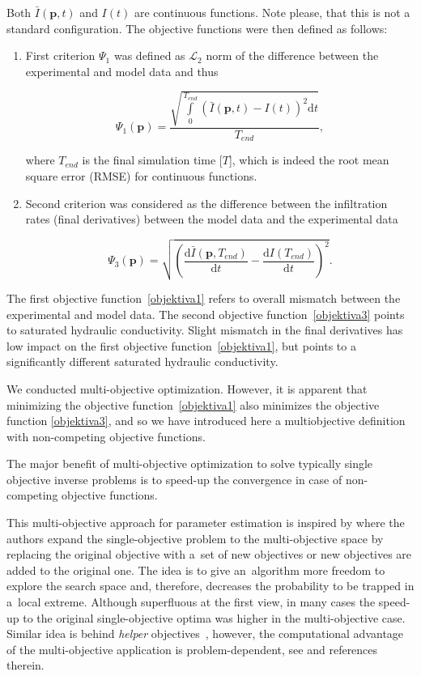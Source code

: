 \documentclass[review,times,3p,10pt]{elsarticle}
\newenvironment{lineq}
    {\begin{linenomath*}
    \begin{equation}
    }
    { 
    \end{equation} 
    \end{linenomath*}
    }
\newcommand{\dd}{\mathrm{d}}
\renewcommand{\vec}{\mathbf}
\begin{document}
{ Both $\bar{I}(\vec{p},t)$ and $I(t)$ are continuous functions. Note please, that this is not a standard configuration. The objective functions were then defined as follows:
\begin{enumerate}[label={\bf \Roman*}.]
\item First criterion $\Psi_1$ was defined as $\mathcal{L}_2$ norm of the difference between the  experimental and model data and thus
\begin{lineq}
\label{objektiva1}
\Psi_1 (\vec{p}) = \frac{\sqrt{\int\limits_0^{T_{end}} \left( \bar{I}(\vec{p},t) - I(t) \right)^2 \dd t}}{T_{end}},
\end{lineq}
where $T_{end}$ is the final simulation time [$T$], which is indeed the root mean square error (RMSE) for continuous functions. 

\item Second criterion was considered as the difference between the infiltration rates (final derivatives) between the model data and the experimental data
\begin{lineq}
\label{objektiva3}
\Psi_3 (\vec{p}) =  \sqrt{\left( \frac{\dd \bar{I}(\vec{p},T_{end})}{\dd t} - \frac{\dd I(T_{end})}{\dd t} \right)^2}.
\end{lineq}


\end{enumerate}

{ The first objective function~\eqref{objektiva1} refers to overall mismatch between the experimental and model data. 
The second objective function~\eqref{objektiva3} points to saturated hydraulic conductivity. Slight mismatch in the final derivatives has low impact on the first objective function~\eqref{objektiva1}, but points to a significantly different saturated hydraulic conductivity. }

 We conducted multi-objective optimization. However, it is apparent that minimizing the objective function~\eqref{objektiva1} also minimizes the objective function \eqref{objektiva3}, and so we have introduced here a multiobjective definition with  non-competing objective functions. 

The major benefit of multi-objective optimization  to solve typically single objective inverse problems is to speed-up the convergence in
case of non-competing objective functions.

This multi-objective approach  for parameter estimation is inspired by \cite{knowles:2001} where the authors expand the
single-objective problem to the multi-objective space by replacing the original objective with a~set of new objectives
or new objectives are added to the original one. The idea is to give an~algorithm more freedom to explore the search
space and, therefore, decreases the probability to be trapped in a~local extreme. Although superfluous at the first
view, in many cases the speed-up to the original single-objective optima was higher in the multi-objective case.
Similar idea is behind {\it helper} objectives~\citep{Jensen:2004}, however, the computational advantage of the
multi-objective application is problem-dependent, see \citep{vitingerova:2010} and references therein.



}
\end{document}
